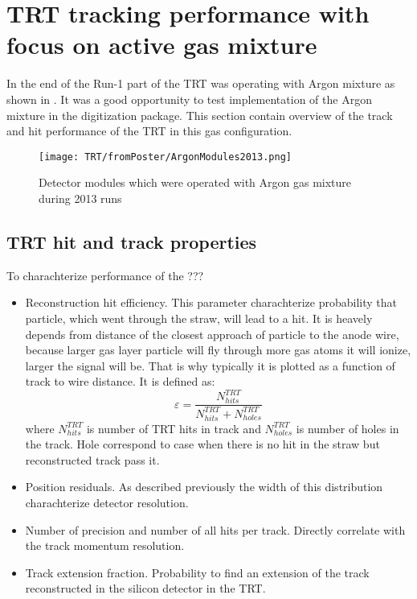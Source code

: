 \section{TRT tracking performance with focus on active gas mixture}
\label{sec:digi_argon}

In the end of the Run-1 part of the TRT was operating with Argon mixture as shown in .
It was a good opportunity to test implementation of the Argon mixture in the digitization package.
This section contain overview of the track and hit performance of the TRT in this gas configuration.

\begin{figure}
\begin{center}
 \texttt{[image: TRT/fromPoster/ArgonModules2013.png]}
\caption{Detector modules which were operated with Argon gas mixture during 2013 runs}
\label{fig:argonModulesIn2013}
\end{center}
\end{figure}

\subsection{TRT hit and track properties}

To charachterize performance of the ???

\begin{itemize}
 \item Reconstruction hit efficiency. This parameter charachterize probability that particle, which went through the straw, will lead to a hit.
 It is heavely depends from distance of the closest approach of particle to the anode wire, because larger gas layer particle will fly through more gas atoms it will
 ionize, larger the signal will be. That is why typically it is plotted as a function of track to wire distance. It is defined as:
 \begin{equation}
  \varepsilon = \dfrac{N^{TRT}_{hits}}{N^{TRT}_{hits} + N^{TRT}_{holes}}
 \end{equation}
 where $N^{TRT}_{hits}$ is number of TRT hits in track and $N^{TRT}_{holes}$ is number of holes in the track. Hole correspond to case when there is no hit in the straw
 but reconstructed track pass it.
 \item Position residuals. As described previously the width of this distribution charachterize detector resolution.
 \item Number of precision and number of all hits per track. Directly correlate with the track momentum resolution.
 \item Track extension fraction. Probability to find an extension of the track reconstructed in the silicon detector in the TRT.
\end{itemize}




